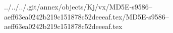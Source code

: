 ../../../.git/annex/objects/Kj/vx/MD5E-s9586--aeff63ea0242b219c151878c52deeeaf.tex/MD5E-s9586--aeff63ea0242b219c151878c52deeeaf.tex